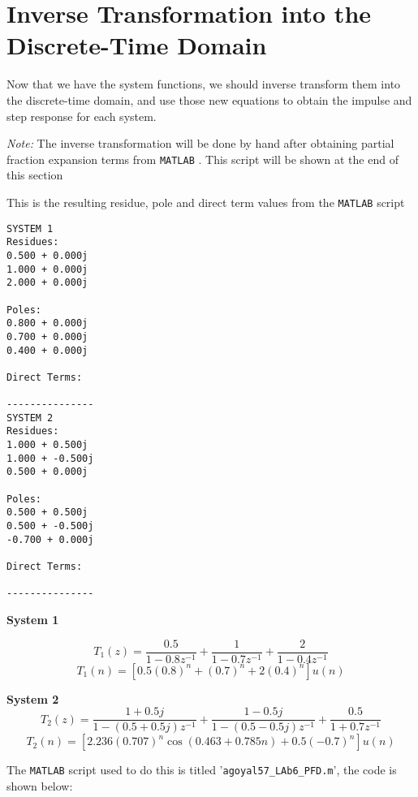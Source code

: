 \documentclass[]{report}
\newcommand{\matlab}{\texttt{MATLAB} }
\begin{document}
\section*{Inverse Transformation into the Discrete-Time Domain}
Now that we have the system functions, we should inverse transform them into the discrete-time domain, and use those new equations to obtain the impulse and step response for each system. 

\textit{Note:} The inverse transformation will be done by hand after obtaining partial fraction expansion terms from \matlab. This script will be shown at the end of this section

\newpage

This is the resulting residue, pole and direct term values from the \matlab script

\begin{lstlisting}[frame=single]
SYSTEM 1
Residues:
0.500 + 0.000j
1.000 + 0.000j
2.000 + 0.000j

Poles:
0.800 + 0.000j
0.700 + 0.000j
0.400 + 0.000j

Direct Terms:

---------------
SYSTEM 2
Residues:
1.000 + 0.500j
1.000 + -0.500j
0.500 + 0.000j

Poles:
0.500 + 0.500j
0.500 + -0.500j
-0.700 + 0.000j

Direct Terms:

---------------
\end{lstlisting}

\textbf{System 1}

\[ T_1(z) = \frac{0.5}{1 - 0.8z^{-1}} + \frac{1}{1 - 0.7z^{-1}} + \frac{2}{1 - 0.4z^{-1}}	\]
\begin{equation}
	T_1(n) = [0.5(0.8)^n + (0.7)^n + 2(0.4)^n] u(n)
\end{equation}

\textbf{System 2}
\[ T_2(z) = \frac{1 + 0.5j}{1 - (0.5 + 0.5j)z^{-1}} + \frac{1 - 0.5j}{1 - (0.5 - 0.5j)z^{-1}} + \frac{0.5}{1 + 0.7z^{-1}} \]
\begin{equation}
	T_2(n) = \left[2.236(0.707)^n\cos{(0.463 + 0.785n)} + 0.5(-0.7)^n\right]u(n)
\end{equation}

\newpage

The \matlab script used to do this is titled '\texttt{agoyal57\_LAb6\_PFD.m}', the code is shown below:
\end{document}
